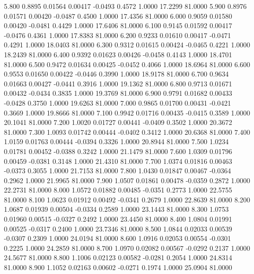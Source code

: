    5.800   0.8895   0.01564   0.00417  -0.0493   0.4572   1.0000  17.2299  81.0000
   5.900   0.8976   0.01571   0.00420  -0.0487   0.4500   1.0000  17.4356  81.0000
   6.000   0.9059   0.01580   0.00420  -0.0481   0.4429   1.0000  17.6406  81.0000
   6.100   0.9145   0.01592   0.00417  -0.0476   0.4361   1.0000  17.8383  81.0000
   6.200   0.9233   0.01610   0.00417  -0.0471   0.4291   1.0000  18.0403  81.0000
   6.300   0.9312   0.01615   0.00424  -0.0465   0.4221   1.0000  18.2439  81.0000
   6.400   0.9392   0.01623   0.00426  -0.0458   0.4143   1.0000  18.4701  81.0000
   6.500   0.9472   0.01634   0.00425  -0.0452   0.4066   1.0000  18.6964  81.0000
   6.600   0.9553   0.01650   0.00422  -0.0446   0.3990   1.0000  18.9178  81.0000
   6.700   0.9634   0.01663   0.00427  -0.0441   0.3916   1.0000  19.1362  81.0000
   6.800   0.9713   0.01671   0.00432  -0.0434   0.3835   1.0000  19.3769  81.0000
   6.900   0.9791   0.01682   0.00433  -0.0428   0.3750   1.0000  19.6263  81.0000
   7.000   0.9865   0.01700   0.00431  -0.0421   0.3669   1.0000  19.8666  81.0000
   7.100   0.9942   0.01716   0.00435  -0.0415   0.3589   1.0000  20.1041  81.0000
   7.200   1.0020   0.01727   0.00441  -0.0409   0.3502   1.0000  20.3672  81.0000
   7.300   1.0093   0.01742   0.00444  -0.0402   0.3412   1.0000  20.6368  81.0000
   7.400   1.0159   0.01763   0.00444  -0.0394   0.3326   1.0000  20.8944  81.0000
   7.500   1.0234   0.01781   0.00452  -0.0388   0.3242   1.0000  21.1479  81.0000
   7.600   1.0309   0.01796   0.00459  -0.0381   0.3148   1.0000  21.4310  81.0000
   7.700   1.0374   0.01816   0.00463  -0.0373   0.3055   1.0000  21.7153  81.0000
   7.800   1.0430   0.01847   0.00467  -0.0364   0.2962   1.0000  21.9965  81.0000
   7.900   1.0507   0.01861   0.00478  -0.0359   0.2872   1.0000  22.2731  81.0000
   8.000   1.0572   0.01882   0.00485  -0.0351   0.2773   1.0000  22.5755  81.0000
   8.100   1.0623   0.01912   0.00492  -0.0341   0.2679   1.0000  22.8639  81.0000
   8.200   1.0687   0.01939   0.00504  -0.0334   0.2589   1.0000  23.1443  81.0000
   8.300   1.0753   0.01960   0.00515  -0.0327   0.2492   1.0000  23.4450  81.0000
   8.400   1.0804   0.01991   0.00525  -0.0317   0.2400   1.0000  23.7346  81.0000
   8.500   1.0844   0.02033   0.00539  -0.0307   0.2309   1.0000  24.0194  81.0000
   8.600   1.0916   0.02053   0.00554  -0.0301   0.2225   1.0000  24.2859  81.0000
   8.700   1.0970   0.02082   0.00567  -0.0292   0.2137   1.0000  24.5677  81.0000
   8.800   1.1006   0.02123   0.00582  -0.0281   0.2054   1.0000  24.8314  81.0000
   8.900   1.1052   0.02163   0.00602  -0.0271   0.1974   1.0000  25.0904  81.0000
